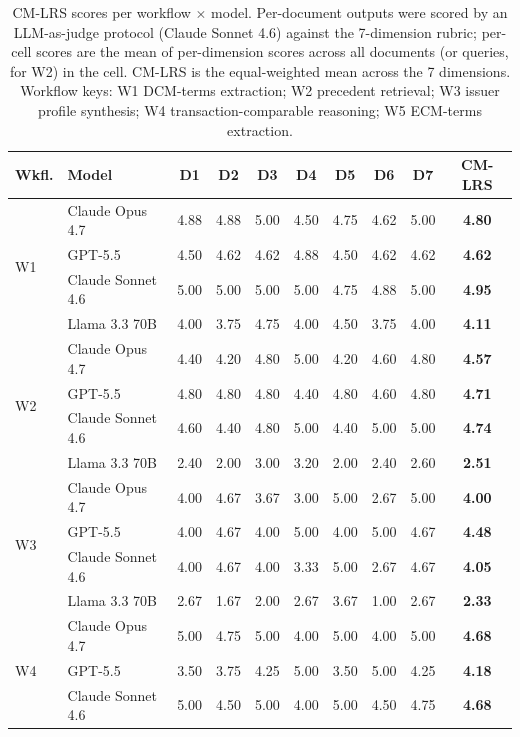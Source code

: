 \documentclass[11pt]{article}
\begin{document}
\begin{table}[h]
\centering
\caption{CM-LRS scores per workflow $\times$ model. Per-document outputs were scored by an LLM-as-judge protocol (Claude Sonnet 4.6) against the 7-dimension rubric; per-cell scores are the mean of per-dimension scores across all documents (or queries, for W2) in the cell. CM-LRS is the equal-weighted mean across the 7 dimensions. Workflow keys: W1 DCM-terms extraction; W2 precedent retrieval; W3 issuer profile synthesis; W4 transaction-comparable reasoning; W5 ECM-terms extraction.}
\label{tab:scoring}
\small
\setlength{\tabcolsep}{4pt}
\begin{tabular}{@{}llccccccc>{\bfseries}c@{}}
\toprule
\textbf{Wkfl.} & \textbf{Model} & D1 & D2 & D3 & D4 & D5 & D6 & D7 & CM-LRS \\
\midrule
\multirow{4}{*}{W1} & Claude Opus 4.7 & 4.88 & 4.88 & 5.00 & 4.50 & 4.75 & 4.62 & 5.00 & 4.80 \\
 & GPT-5.5 & 4.50 & 4.62 & 4.62 & 4.88 & 4.50 & 4.62 & 4.62 & 4.62 \\
 & Claude Sonnet 4.6 & 5.00 & 5.00 & 5.00 & 5.00 & 4.75 & 4.88 & 5.00 & 4.95 \\
 & Llama 3.3 70B & 4.00 & 3.75 & 4.75 & 4.00 & 4.50 & 3.75 & 4.00 & 4.11 \\
\midrule
\multirow{4}{*}{W2} & Claude Opus 4.7 & 4.40 & 4.20 & 4.80 & 5.00 & 4.20 & 4.60 & 4.80 & 4.57 \\
 & GPT-5.5 & 4.80 & 4.80 & 4.80 & 4.40 & 4.80 & 4.60 & 4.80 & 4.71 \\
 & Claude Sonnet 4.6 & 4.60 & 4.40 & 4.80 & 5.00 & 4.40 & 5.00 & 5.00 & 4.74 \\
 & Llama 3.3 70B & 2.40 & 2.00 & 3.00 & 3.20 & 2.00 & 2.40 & 2.60 & 2.51 \\
\midrule
\multirow{4}{*}{W3} & Claude Opus 4.7 & 4.00 & 4.67 & 3.67 & 3.00 & 5.00 & 2.67 & 5.00 & 4.00 \\
 & GPT-5.5 & 4.00 & 4.67 & 4.00 & 5.00 & 4.00 & 5.00 & 4.67 & 4.48 \\
 & Claude Sonnet 4.6 & 4.00 & 4.67 & 4.00 & 3.33 & 5.00 & 2.67 & 4.67 & 4.05 \\
 & Llama 3.3 70B & 2.67 & 1.67 & 2.00 & 2.67 & 3.67 & 1.00 & 2.67 & 2.33 \\
\midrule
\multirow{4}{*}{W4} & Claude Opus 4.7 & 5.00 & 4.75 & 5.00 & 4.00 & 5.00 & 4.00 & 5.00 & 4.68 \\
 & GPT-5.5 & 3.50 & 3.75 & 4.25 & 5.00 & 3.50 & 5.00 & 4.25 & 4.18 \\
 & Claude Sonnet 4.6 & 5.00 & 4.50 & 5.00 & 4.00 & 5.00 & 4.50 & 4.75 & 4.68 \\

\end{tabular}
\end{table}
\end{document}
